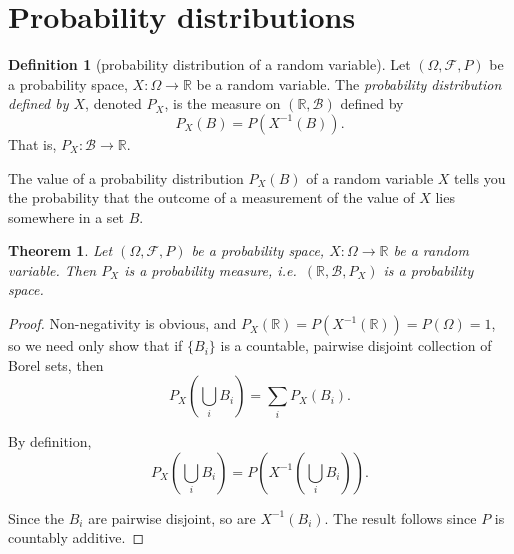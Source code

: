\documentclass[a4paper]{scrartcl}
\newcommand{\R}{\mathbb{R}}
\theoremstyle{definition}
\newtheorem{definition}{Definition}[section]
\theoremstyle{plain}
\newtheorem{theorem}{Theorem}[section]
\theoremstyle{remark}
\begin{document}
\section{Probability distributions}
\begin{definition}[probability distribution of a random variable]
  \label{def:probabilitydistributionofrandomvariable}
  Let $(\Omega, \mathcal{F}, P)$ be a probability space, $X\colon \Omega \to \R$ be a random variable. The \emph{probability distribution defined by $X$}, denoted $P_{X}$, is the measure on $(\R, \mathcal{B})$ defined by
  \begin{equation*}
    P_{X}(B) = P(X^{-1}(B)).
  \end{equation*}
  That is, $P_{X}\colon \mathcal{B} \to \R$.
\end{definition}

The value of a probability distribution $P_{X}(B)$ of a random variable $X$ tells you the probability that the outcome of a measurement of the value of $X$ lies somewhere in a set $B$.

\begin{theorem}
  Let $(\Omega, \mathcal{F}, P)$ be a probability space, $X\colon \Omega \to \R$ be a random variable. Then $P_{X}$ is a probability measure, i.e.\ $(\R, \mathcal{B}, P_{X})$ is a probability space.
\end{theorem}
\begin{proof}
  Non-negativity is obvious, and $P_{X}(\R) = P(X^{-1}(\R)) = P(\Omega) = 1$, so we need only show that if $\{B_{i}\}$ is a countable, pairwise disjoint collection of Borel sets, then
  \begin{equation*}
    P_{X}\left( \bigcup_{i} B_{i} \right) = \sum_{i} P_{X}(B_{i}).
  \end{equation*}

  By definition,
  \begin{equation*}
    P_{X}\left( \bigcup_{i} B_{i} \right) = P\left( X^{-1}\left( \bigcup_{i} B_{i} \right) \right).
  \end{equation*}

  Since the $B_{i}$ are pairwise disjoint, so are $X^{-1}(B_{i})$. The result follows since $P$ is countably additive.
\end{proof}
\end{document}
